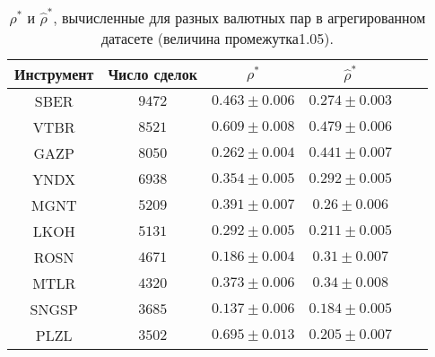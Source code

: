 \begin{table}[h!]
    \begin{center}
        \begin{tabular}{|c|c|c|c|c|c|}
            \hline
            Инструмент & Число сделок & $\rho^*$ & $\hat \rho^*$           \\ \hline
            SBER & $9472$ & $0.463 \pm 0.006$ & $0.274 \pm 0.003$ \\ \hline
            VTBR       & $8521$       & $0.609 \pm 0.008$ & $0.479 \pm 0.006$ \\ \hline
            GAZP       & $8050$       & $0.262 \pm 0.004$ & $0.441 \pm 0.007$ \\ \hline
            YNDX       & $6938$       & $0.354 \pm 0.005$ & $0.292 \pm 0.005$ \\ \hline
            MGNT       & $5209$       & $0.391 \pm 0.007$ & $0.26 \pm 0.006$  \\ \hline
            LKOH       & $5131$       & $0.292 \pm 0.005$ & $0.211 \pm 0.005$ \\ \hline
            ROSN       & $4671$       & $0.186 \pm 0.004$ & $0.31 \pm 0.007$  \\ \hline
            MTLR       & $4320$       & $0.373 \pm 0.006$ & $0.34 \pm 0.008$  \\ \hline
            SNGSP      & $3685$       & $0.137 \pm 0.006$ & $0.184 \pm 0.005$ \\ \hline
            PLZL       & $3502$       & $0.695 \pm 0.013$ & $0.205 \pm 0.007$ \\ \hline
        \end{tabular}
    \end{center}\caption{$\rho^*$ и $\hat \rho^*$, вычисленные для разных валютных пар в агрегированном датасете (величина промежутка1.05).}
    \label{Aggreg1CU1.05} \end{table}
